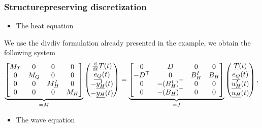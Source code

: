 \documentclass[letterpaper,10pt,english]{sphinxmanual}
\begin{document}
\subsubsection{Structure\sphinxhyphen{}preserving discretization}
\label{\detokenize{examples/heat_wave:structure-preserving-discretization}}\begin{itemize}
\item {} 
\sphinxAtStartPar
The heat equation

\end{itemize}

\sphinxAtStartPar
We use the div\sphinxhyphen{}div formulation already presented in the 
example,  we obtain the following system
\begin{equation*}
\begin{split}\underbrace{\begin{bmatrix}
M_T & 0 & 0 & 0 \\
0 & M_Q & 0 & 0 \\
0 & 0 & M^I_H & 0 \\
0 & 0 & 0 & M_H
\end{bmatrix}}_{= M}
\begin{pmatrix}
\frac{\rm d}{{\rm d}t} \underline{T}(t) \\
\underline{e_Q}(t) \\
-\underline{y^I_H}(t) \\
-\underline{y_H}(t)
\end{pmatrix}
=
\underbrace{\begin{bmatrix}
0 & D & 0 & 0 \\
-D^\top & 0 & B^I_H & B_H \\
0 & -(B^I_H)^\top & 0 & 0 \\
0 & -(B_H)^\top & 0 & 0
\end{bmatrix}}_{= J}
\begin{pmatrix}
\underline{T}(t) \\
\underline{e_Q}(t) \\
\underline{u^I_H}(t) \\
\underline{u_H}(t)
\end{pmatrix},\end{split}
\end{equation*}\begin{itemize}
\item {} 
\sphinxAtStartPar
The wave equation

\end{itemize}
\end{document}
